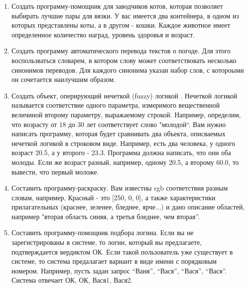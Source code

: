 \documentclass[12pt, oneside]{article}
\begin{document}
\begin{enumerate}
  \item Создать программу-помощник для заводчиков котов, которая позволяет выбирать лучшие пары для вязки. У вас имеется два контейнера, в одном из которых представлены коты, а в другом - кошки. Каждое животное имеет определенное количество наград, уровень здоровья и возраст.
  \item Создать программу автоматического перевода текстов о погоде. Для этого воспользваться словарем, в котором слову может соответствовать несколько синонимов переводов. Для каждого синонима указан набор слов, с котороыми он сочетается наилучшим образом.
  \item Создать объект, оперирующий нечеткой (fuzzy) логикой . Нечеткой логикой называется соответствие одного параметра, измеримого вещественной величиной второму параметру, выражаемому строкой. Например, определим, что возрасту от 18 до 30 лет соответствует слово "молодой``. Вам нужно написать программу, которая будет сравнивать два объекта, описваемых нечеткой логикой в строковом виде. Например, есть два человека, у одного возраст 20.5, а у второго - 23.3. Программа должна написать, что они оба молоды. Если же возраст разный, например, одному 20.5, а второму 60.0, то вывести, что первый моложе.
  \item Составить программу-раскраску. Вам известны rgb соответствия разным словам, например, Красный - это [250, 0, 0], а также характеристики прилагательных (краснее, зеленее, бледнее, ярче...) и дано описание областей, например "вторая область синяя, а третья бледнее, чем вторая''.
  \item Составить программу-помощник подбора логина. Если вы не зарегистрированы в системе, то логин, который вы предлагаете, подтверждается вердиктом ОК. Если такой пользователь уже существует в системе, то система предалагает вариант в виде имени с порядковым номером. Например, пусть задан запрос ``Ваня'', ``Вася'', ``Вася'', ``Вася''. Система отвечает ОК, ОК, Вася1, Вася2.
 \end{enumerate}
\end{document}
